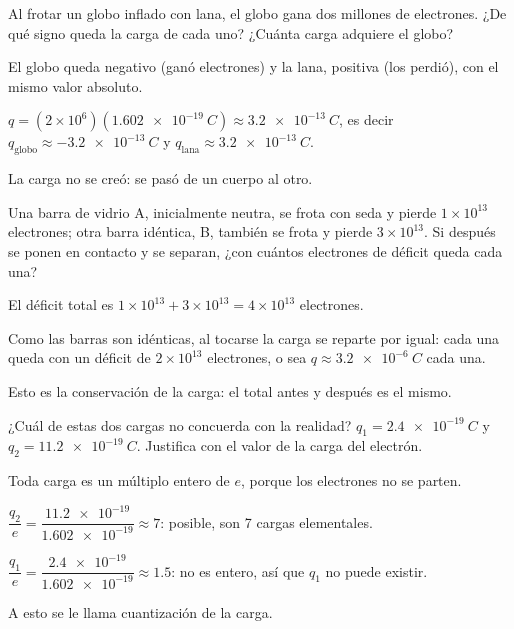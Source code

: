 \documentclass[11pt]{article}
\begin{document}
\begin{preguntas}
\pregunta[1] Al frotar un globo inflado con lana, el globo gana dos millones de electrones.
¿De qué signo queda la carga de cada uno? ¿Cuánta carga adquiere el globo?
\begin{solucion}[4cm]
El globo queda negativo (ganó electrones) y la lana, positiva (los perdió), con el mismo valor
absoluto.

$q = (2\times10^{6})(\qty{1,602e-19}{C}) \approx \qty{3,2e-13}{C}$, es decir
$q_{\text{globo}} \approx \qty{-3,2e-13}{C}$ y $q_{\text{lana}} \approx \qty{+3,2e-13}{C}$.

La carga no se creó: se pasó de un cuerpo al otro.
\end{solucion}

\pregunta[1] Una barra de vidrio A, inicialmente neutra, se frota con seda y pierde
$1\times10^{13}$ electrones; otra barra idéntica, B, también se frota y pierde
$3\times10^{13}$. Si después se ponen en contacto y se separan, ¿con cuántos electrones de
déficit queda cada una?
\begin{solucion}[4.5cm]
El déficit total es $1\times10^{13} + 3\times10^{13} = 4\times10^{13}$ electrones.

Como las barras son idénticas, al tocarse la carga se reparte por igual: cada una queda con un
déficit de $2\times10^{13}$ electrones, o sea $q \approx \qty{+3,2e-6}{C}$ cada una.

Esto es la conservación de la carga: el total antes y después es el mismo.
\end{solucion}

\pregunta[1] ¿Cuál de estas dos cargas no concuerda con la realidad?
$q_1 = \qty{2,4e-19}{C}$ y $q_2 = \qty{11,2e-19}{C}$. Justifica con el valor de la carga del
electrón.
\begin{solucion}[4.5cm]
Toda carga es un múltiplo entero de $e$, porque los electrones no se parten.

$\dfrac{q_2}{e} = \dfrac{\num{11,2e-19}}{\num{1,602e-19}} \approx 7$: posible, son 7 cargas
elementales.

$\dfrac{q_1}{e} = \dfrac{\num{2,4e-19}}{\num{1,602e-19}} \approx \num{1,5}$: no es entero, así
que $q_1$ no puede existir.

A esto se le llama cuantización de la carga.
\end{solucion}

\end{preguntas}
\end{document}
